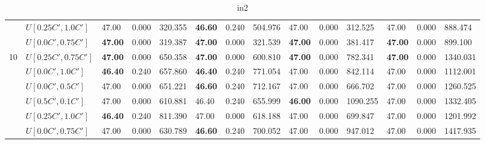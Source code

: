 \begin{table}[h]
{\begin{tabular}{|l|l||l|l|l||l|l|l||l|l|l||l|l|l|}
       & $U[0.25C',1.0C']$ & 47.00 & 0.000 & 320.355 & \textbf{46.60} & 0.240 & 504.976 				& 47.00 & 0.000 & 312.525 & 47.00 & 0.000 & 888.474\\
       & $U[0.0C',0.75C']$ & \textbf{47.00} & 0.000 & 319.387 & \textbf{47.00} & 0.000 & 321.539 	& \textbf{47.00} & 0.000 & 381.417 & \textbf{47.00} & 0.000 & 899.100\\
      \hline\hline
      \multirow{6}{*}{10}
       & $U[0.25C',0.75C']$ & \textbf{47.00} & 0.000 & 650.358 & \textbf{47.00} & 0.000 & 600.810 	& \textbf{47.00} & 0.000 & 782.341 & \textbf{47.00} & 0.000 & 1340.031\\
       & $U[0.0C',1.0C']$ & \textbf{46.40} & 0.240 & 657.860 & \textbf{46.40} & 0.240 & 771.054		& 47.00 & 0.000 & 842.114 & 47.00 & 0.000 & 1112.001\\
       & $U[0.0C',0.5C']$ & 47.00 & 0.000 & 651.221 & \textbf{46.60} & 0.240 & 712.167 				& 47.00 & 0.000 & 666.702 & 47.00 & 0.000 & 1260.525\\
       & $U[0.5C',0.1C']$ & 47.00 & 0.000 & 610.881 & 46.40 & 0.240 & 655.999 						& \textbf{46.00} & 0.000 & 1090.255 & 47.00 & 0.000 & 1332.405\\
       & $U[0.25C',1.0C']$ & \textbf{46.40} & 0.240 & 811.390 & 47.00 & 0.000 & 618.188 				& 47.00 & 0.000 & 699.847 & 47.00 & 0.000 & 1201.992\\
       & $U[0.0C',0.75C']$ & 47.00 & 0.000 & 630.789 & \textbf{46.60} & 0.240 & 700.052 				& 47.00 & 0.000 & 947.012 & 47.00 & 0.000 & 1417.935\\
      \hline
      \end{tabular}
      }
      \caption{in2}
      \label{tab:in2}
      \end{table}


